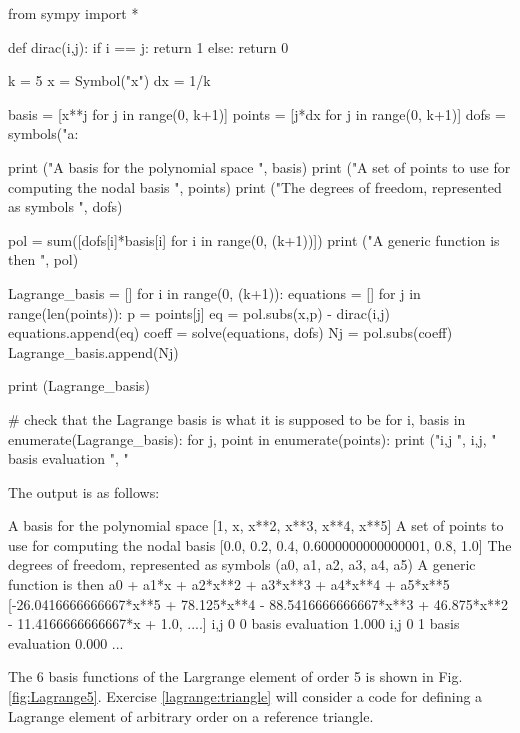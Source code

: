 \begin{python}
from sympy import * 

def dirac(i,j): 
  if i == j: return 1 
  else: return 0 

k = 5  
x = Symbol("x") 
dx = 1/k 

basis = [x**j for j in range(0, k+1)] 
points = [j*dx for j in range(0, k+1)] 
dofs = symbols("a:%

print ("A basis for the polynomial space ", basis) 
print ("A set of points to use for computing the nodal basis ", points) 
print ("The degrees of freedom, represented as symbols ", dofs) 

pol = sum([dofs[i]*basis[i] for i in range(0, (k+1))])   
print ("A generic function is then ", pol)

Lagrange_basis = []
for i in range(0, (k+1)): 
  equations = []
  for j in range(len(points)):  
    p = points[j]
    eq = pol.subs(x,p) - dirac(i,j) 
    equations.append(eq)
  coeff = solve(equations, dofs) 
  Nj = pol.subs(coeff)
  Lagrange_basis.append(Nj) 

print (Lagrange_basis) 

# check that the Lagrange basis is what it is supposed to be 
for i, basis in enumerate(Lagrange_basis): 
    for j, point in enumerate(points): 
        print ("i,j ", i,j, " basis evaluation ",  "%
\end{python}
The output is as follows: 
\begin{python}
A basis for the polynomial space  [1, x, x**2, x**3, x**4, x**5]
A set of points to use for computing the nodal basis  [0.0, 0.2, 0.4, 0.6000000000000001, 0.8, 1.0]
The degrees of freedom, represented as symbols  (a0, a1, a2, a3, a4, a5)
A generic function is then  a0 + a1*x + a2*x**2 + a3*x**3 + a4*x**4 + a5*x**5
[-26.0416666666667*x**5 + 78.125*x**4 - 88.5416666666667*x**3 + 46.875*x**2 - 11.4166666666667*x + 1.0, ....]
i,j  0 0  basis evaluation  1.000
i,j  0 1  basis evaluation  0.000
...
\end{python}
The 6 basis functions of the Largrange element of order 5 is shown in Fig. \ref{fig:Lagrange5}. 
Exercise \ref{lagrange:triangle} will consider a code for defining a Lagrange element of arbitrary order on a reference triangle.  

